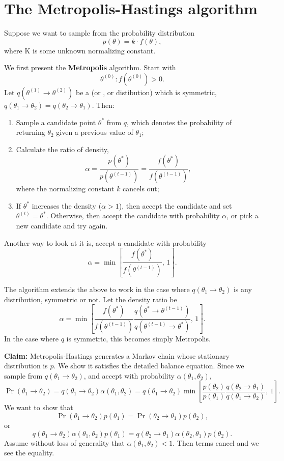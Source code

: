 \documentclass[thesis.tex]{subfiles}
\begin{document}
\section{The Metropolis-Hastings algorithm}

Suppose we want to sample from the probability distribution \[
  p(\theta) = k\cdot f(\theta),
\] where K is some unknown normalizing constant.

We first present the \textbf{Metropolis} algorithm. Start with \[
  \theta^{(0)} : f(\theta^{(0)}) > 0.
\] Let \(q(\theta^{(1)} \to \theta^{(2)})\) be a  (or , or  distibution) which is symmetric, \(q(\theta_1 \to \theta_2) = q(\theta_2 \to \theta_1)\). Then:

\begin{enumerate}
\item Sample a candidate point \(\theta^*\) from \(q\), which denotes the probability of returning \(\theta_2\) given a previous value of \(\theta_1\);

\item Calculate the ratio of density, \[
  \alpha = \frac{p(\theta^*)}{p(\theta^{(t-1)})} = \frac{f(\theta^*)}{f(\theta^{(t-1)})},
\] where the normalizing constant \(k\) cancels out;

\item If \(\theta^*\) increases the density (\(\alpha > 1\)), then accept the candidate and set \(\theta^{(t)} = \theta^*\). Otherwise, then accept the candidate with probability \(\alpha\), or pick a new candidate and try again.

\end{enumerate}

Another way to look at it is, accept a candidate with probability \[
  \alpha = \min\left[ \frac{f(\theta^*)}{f(\theta^{(t-1)})},\, 1 \right].
\]

The  algorithm extends the above to work in the case where \(q(\theta_1 \to \theta_2)\) is any distribution, symmetric or not. Let the density ratio be \[
  \alpha = \min \left[ \frac{f(\theta^*)}{f(\theta^{(t-1)})}\frac{q(\theta^* \to \theta^{(t-1)})}{q(\theta^{(t-1)} \to \theta^*)},\, 1 \right].
\] In the case where \(q\) is symmetric, this becomes simply Metropolis.

\bigskip

\noindent\textbf{Claim:} Metropolis-Hastings generates a Markov chain whose stationary distribution is \(p\). We show it satisfies the detailed balance equation. Since we sample from \(q(\theta_1 \to \theta_2)\), and accept with probability \(\alpha(\theta_1, \theta_2)\), \[
  \Pr(\theta_1 \to \theta_2) = q(\theta_1 \to \theta_2)  \alpha(\theta_1, \theta_2) = q(\theta_1 \to \theta_2) \min \left[\frac{p(\theta_2)}{p(\theta_1)}\frac{q(\theta_2 \to \theta_1)}{q(\theta_1 \to \theta_2)} ,\, 1\right].
\] We want to show that \[
  \Pr(\theta_1 \to \theta_2) p(\theta_1) = \Pr(\theta_2 \to \theta_1)p(\theta_2),
\] or \[
  q(\theta_1 \to \theta_2)\alpha(\theta_1, \theta_2) p(\theta_1) = q(\theta_2 \to \theta_1) \alpha(\theta_2, \theta_1) p(\theta_2).
\] Assume without loss of generality that \(\alpha(\theta_1, \theta_2) < 1\). Then terms cancel and we see the equality.
\end{document}
